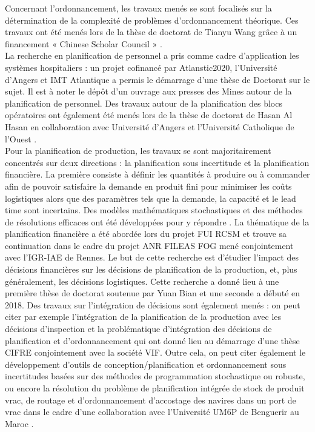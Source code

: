 Concernant l’ordonnancement, les travaux menés se sont focalisés sur la détermination de la complexité de problèmes d’ordonnancement théorique. Ces travaux ont été menés lors de la thèse de doctorat de Tianyu Wang grâce à un financement « Chinese Scholar Council » \cite{wang:hal-02062182,wang:hal-02062178}. \\ 

La recherche en planification de personnel a pris comme cadre d’application les systèmes hospitaliers : un projet cofinancé par Atlanstic2020, l’Université d’Angers et IMT Atlantique a permis le démarrage d’une thèse de Doctorat sur le sujet. Il est à noter le dépôt d’un ouvrage aux presses des Mines autour de la planification de personnel. Des travaux autour de la planification des blocs opératoires ont également été menés lors de la thèse de doctorat de Hasan Al Hasan en collaboration avec Université d’Angers et l’Université Catholique de l’Ouest \cite{alhasan:hal-01875359}. \\

Pour la planification de production, les travaux se sont majoritairement concentrés sur deux directions : la planification sous incertitude et la planification financière. La première consiste à définir les quantités à produire ou à commander afin de pouvoir satisfaire la demande en produit fini pour minimiser les coûts logistiques alors que des paramètres tels que la demande, la capacité et le lead time sont incertains. Des modèles mathématiques stochastiques et des méthodes de résolutions efficaces ont été développées pour y répondre \cite{borodin:hal-01313213,benammar:hal-01961194,benammar:hal-01769391,benammar:hal-02435962,benammar:hal-02415341,thevenin:hal-02485676}. La thématique de la planification financière a été abordée lors du projet FUI RCSM et trouve sa continuation dans le cadre du projet ANR FILEAS FOG mené conjointement avec l’IGR-IAE de Rennes. Le but de cette recherche est d'étudier l’impact des décisions financières sur les décisions de planification de la production, et, plus généralement, les décisions logistiques.  Cette recherche a donné lieu à une première thèse de doctorat soutenue par Yuan Bian \cite{bian:halshs-01683781,bian:hal-02190123} et une seconde a débuté en 2018.  Des travaux sur l’intégration de décisions sont également menés : on peut citer par exemple l’intégration de la planification de la production avec les décisions d’inspection \cite{bettayeb:hal-01689377} et la problématique d’intégration des décisions de planification et d’ordonnancement qui ont donné lieu au démarrage d’une thèse CIFRE conjointement avec la société VIF. Outre cela, on peut citer également le développement d’outils de conception/planification et ordonnancement sous incertitudes basées sur des méthodes de programmation stochastique ou robuste, ou encore la résolution du problème de planification intégrée de stock de produit vrac, de routage et d’ordonnancement d’accostage des navires dans un port de vrac dans le cadre d'une collaboration avec l’Université UM6P de Benguerir au Maroc \cite{Najid2020}.\\

